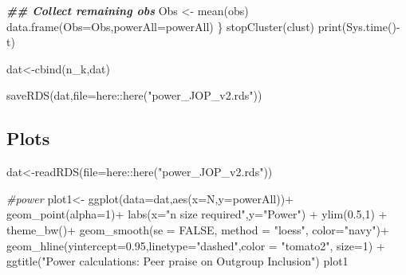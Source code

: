 \documentclass[
]{article}
\newenvironment{Shaded}{\begin{snugshade}}{\end{snugshade}}
\newcommand{\AttributeTok}[1]{\textcolor[rgb]{0.77,0.63,0.00}{#1}}
\newcommand{\CommentTok}[1]{\textcolor[rgb]{0.56,0.35,0.01}{\textit{#1}}}
\newcommand{\ConstantTok}[1]{\textcolor[rgb]{0.00,0.00,0.00}{#1}}
\newcommand{\DecValTok}[1]{\textcolor[rgb]{0.00,0.00,0.81}{#1}}
\newcommand{\DocumentationTok}[1]{\textcolor[rgb]{0.56,0.35,0.01}{\textbf{\textit{#1}}}}
\newcommand{\FloatTok}[1]{\textcolor[rgb]{0.00,0.00,0.81}{#1}}
\newcommand{\FunctionTok}[1]{\textcolor[rgb]{0.00,0.00,0.00}{#1}}
\newcommand{\NormalTok}[1]{#1}
\newcommand{\OtherTok}[1]{\textcolor[rgb]{0.56,0.35,0.01}{#1}}
\newcommand{\SpecialCharTok}[1]{\textcolor[rgb]{0.00,0.00,0.00}{#1}}
\newcommand{\StringTok}[1]{\textcolor[rgb]{0.31,0.60,0.02}{#1}}
\begin{document}
\begin{Shaded}
\begin{Highlighting}[]
  \DocumentationTok{\#\# Collect remaining obs}
\NormalTok{  Obs }\OtherTok{\textless{}{-}} \FunctionTok{mean}\NormalTok{(obs)}
  \FunctionTok{data.frame}\NormalTok{(}\AttributeTok{Obs=}\NormalTok{Obs,}\AttributeTok{powerAll=}\NormalTok{powerAll)}
\NormalTok{\}}
\FunctionTok{stopCluster}\NormalTok{(clust)}
\FunctionTok{print}\NormalTok{(}\FunctionTok{Sys.time}\NormalTok{()}\SpecialCharTok{{-}}\NormalTok{t)}

\NormalTok{dat}\OtherTok{\textless{}{-}}\FunctionTok{cbind}\NormalTok{(n\_k,dat)}

\FunctionTok{saveRDS}\NormalTok{(dat,}\AttributeTok{file=}\NormalTok{here}\SpecialCharTok{::}\FunctionTok{here}\NormalTok{(}\StringTok{"power\_JOP\_v2.rds"}\NormalTok{))}
\end{Highlighting}
\end{Shaded}

\hypertarget{plots}{%
\subsection{Plots}\label{plots}}

\begin{Shaded}
\begin{Highlighting}[]
\NormalTok{dat}\OtherTok{\textless{}{-}}\FunctionTok{readRDS}\NormalTok{(}\AttributeTok{file=}\NormalTok{here}\SpecialCharTok{::}\FunctionTok{here}\NormalTok{(}\StringTok{"power\_JOP\_v2.rds"}\NormalTok{))}

\CommentTok{\#power }
\NormalTok{plot1}\OtherTok{\textless{}{-}} \FunctionTok{ggplot}\NormalTok{(}\AttributeTok{data=}\NormalTok{dat,}\FunctionTok{aes}\NormalTok{(}\AttributeTok{x=}\NormalTok{N,}\AttributeTok{y=}\NormalTok{powerAll))}\SpecialCharTok{+}
  \FunctionTok{geom\_point}\NormalTok{(}\AttributeTok{alpha=}\DecValTok{1}\NormalTok{)}\SpecialCharTok{+}
  \FunctionTok{labs}\NormalTok{(}\AttributeTok{x=}\StringTok{"n size required"}\NormalTok{,}\AttributeTok{y=}\StringTok{"Power"}\NormalTok{) }\SpecialCharTok{+} \FunctionTok{ylim}\NormalTok{(}\FloatTok{0.5}\NormalTok{,}\DecValTok{1}\NormalTok{) }\SpecialCharTok{+}
  \FunctionTok{theme\_bw}\NormalTok{()}\SpecialCharTok{+}
  \FunctionTok{geom\_smooth}\NormalTok{(}\AttributeTok{se =} \ConstantTok{FALSE}\NormalTok{, }\AttributeTok{method =} \StringTok{"loess"}\NormalTok{, }\AttributeTok{color=}\StringTok{"navy"}\NormalTok{)}\SpecialCharTok{+}
  \FunctionTok{geom\_hline}\NormalTok{(}\AttributeTok{yintercept=}\FloatTok{0.95}\NormalTok{,}\AttributeTok{linetype=}\StringTok{"dashed"}\NormalTok{,}\AttributeTok{color =} \StringTok{"tomato2"}\NormalTok{, }\AttributeTok{size=}\DecValTok{1}\NormalTok{) }\SpecialCharTok{+}
  \FunctionTok{ggtitle}\NormalTok{(}\StringTok{"Power calculations: Peer praise on Outgroup Inclusion"}\NormalTok{)}
\NormalTok{plot1}
\end{Highlighting}
\end{Shaded}
\end{document}
